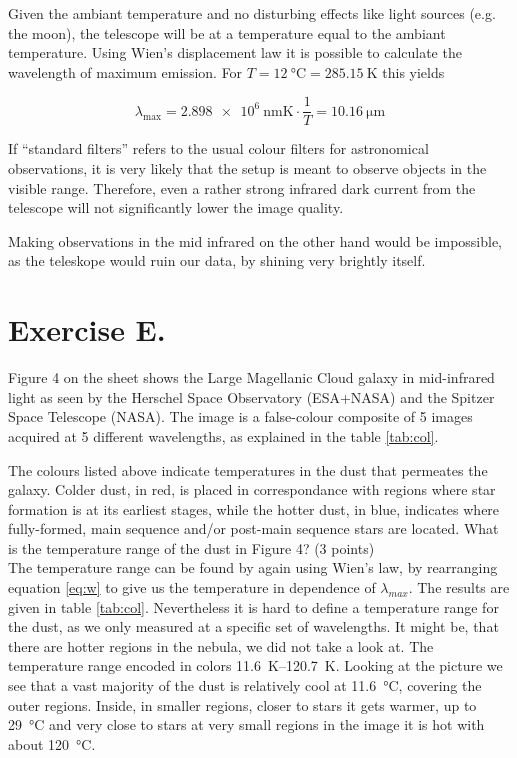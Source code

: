 \documentclass[11pt,a4paper,twoside]{article}
\newcommand{\red}[1]{\textcolor{red}{#1}}
\begin{document}
Given the ambiant temperature and no disturbing effects like light sources
(e.g. the moon), the telescope will be at a temperature equal to the ambiant
temperature. Using Wien's displacement law it is possible to calculate the
wavelength of maximum emission. For $T = \SI{12}{\celsius} =
\SI{285.15}{\kelvin}$ this yields

\begin{equation}
 \lambda_{\text{max}} = \SI{2.898e6}{\nano\metre\kelvin} \cdot \frac{1}{T} = \SI{10.16}{\micro\metre}
\end{equation}

If ``standard filters'' refers to the usual colour filters for astronomical
observations, it is very likely that the setup is meant to observe objects in
the visible range. Therefore, even a rather strong infrared dark current from
the telescope will not significantly lower the image quality. 

Making observations in the mid infrared on the other hand would be impossible,
as the teleskope would ruin our data, by shining very brightly itself.


\section*{Exercise E.}

Figure 4 on the sheet shows the Large Magellanic Cloud galaxy in mid-infrared
light as seen by the Herschel Space Observatory (ESA+NASA) and the Spitzer
Space Telescope (NASA). The image is a false-colour composite of 5 images
acquired at 5 different wavelengths, as explained in the table \ref{tab:col}.


The colours listed above indicate temperatures in the dust that permeates the
galaxy.  Colder dust, in red, is placed in correspondance with regions where
star formation is at its earliest stages, while the hotter dust, in blue,
indicates where fully-formed, main sequence and/or post-main sequence stars are
located.  What is the temperature range of the dust in Figure 4? (3 points) \\

The temperature range can be found by again using Wien's law, by rearranging
equation \ref{eq:w} to give us the temperature in dependence of $\lambda_{max}$.
The results are given in table \ref{tab:col}. 
Nevertheless it is hard to define a temperature range for the dust, as we only
measured at a specific set of wavelengths. It might be, that there are hotter
regions in the nebula, we did not take a look at.
The temperature range encoded in colors \SIrange{11.6}{120.7}{\kelvin}.
Looking at the picture we see that a vast majority of the dust is relatively 
cool at \SI{11.6}{\celsius}, covering the outer regions. Inside, in smaller
regions, closer to stars it gets warmer, up to \SI{29}{\celsius} and very close
to stars at very small regions in the image it is hot with about
\SI{120}{\celsius}.
\end{document}
